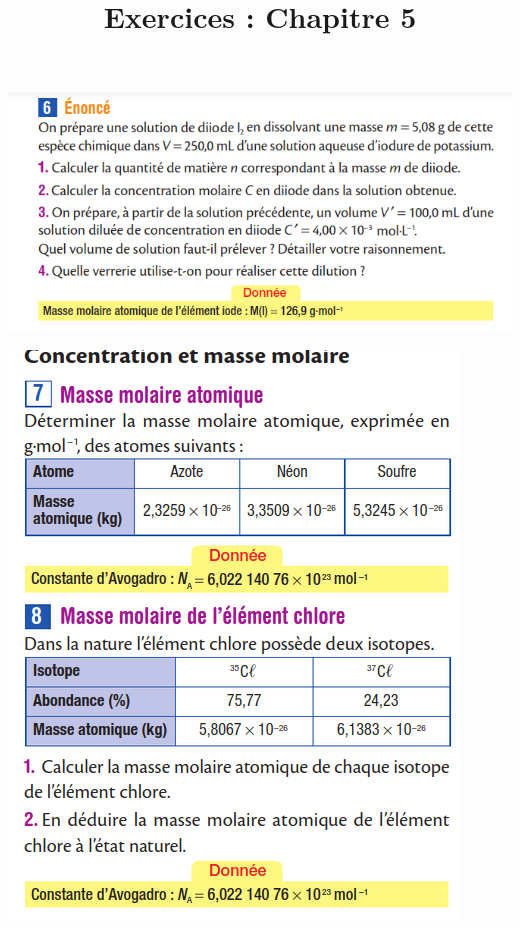 \documentclass[10pt]{article}
\newcommand{\myscale}{0.41}
\newcommand{\titreActivite}{\huge Exercices : Chapitre 5} %
\begin{document}
\date{}
\title{\titreActivite}
\maketitle %


\vspace{-20pt}
\begin{center}

	\begin{minipage}[c]{0.45\textwidth}
		\centering

		\includegraphics[scale=\myscale]{assets/1a.png}

		\includegraphics[scale=\myscale]{assets/7-8.png}


\end{minipage}
\end{center}
\end{document}
